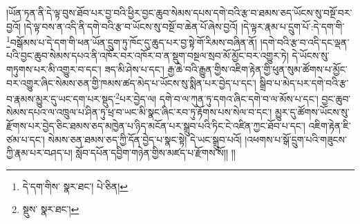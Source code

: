 །ཡོན་ཏན་ནི་དེ་ལྟ་བུས་ཐོབ་པར་བྱ་བའི་ཕྱིར་བྱང་ཆུབ་སེམས་དཔས་དགེ་བའི་རྩ་བ་ཐམས་ཅད་ཡོངས་སུ་བསྔོ་བར་བྱའོ། །དེ་ལྟ་བས་ན་འདི་ནི་དགེ་བའི་རྩ་བ་ཡོངས་སུ་བསྔོ་བ་ཆེན་པོ་ཞེས་བྱའོ། །དེ་ལྟར་རྣམ་པ་དྲུག་པོ་:དེ་དག་གི་\footnote{དེ་དག་གིས་  སྣར་ཐང་།  པེ་ཅིན། }བསྒོམས་པ་དེ་དག་གི་ཕན་ཡོན་དྲུག་ཏུ་ཁོང་དུ་ཆུད་པར་བྱ་སྟེ་གོ་རིམས་བཞིན་ནོ། །དགེ་བའི་རྩ་བ་འདི་དང་ལྡན་པའི་བྱང་ཆུབ་སེམས་དཔའ་ནི་འཁོར་བར་འཁོར་བ་ན་སྡུག་བསྔལ་སྲབ་མོ་མྱོང་བར་འགྱུར་ཏེ། དེ་ཡོངས་སུ་གཏུགས་པར་མི་འགྱུར་བ་དང་། ཟད་མི་ཤེས་པ་དང་། རྒྱ་ཆེ་བའི་རྒྱུན་གྱིས་འཇིག་རྟེན་གྱི་ཕུན་སུམ་ཚོགས་པ་མྱོང་བར་འགྱུར་ཞིང་སེམས་ཅན་གྱི་ཁམས་ཚད་མེད་པ་ཡོངས་སུ་སྨིན་པར་བྱེད་པ་དང་། སྒྲིབ་པ་མེད་པར་དགེ་བའི་རྩ་བ་རྣམས་མྱུར་དུ་ཡང་དག་པར་སྡུད་\footnote{སྡུས་  སྣར་ཐང་། }པར་བྱེད་ལ། དགེ་བ་ལ་ཀུན་ཏུ་དགའ་ཞིང་དགེ་བ་ལ་མོས་པ་དང་། བྱང་ཆུབ་སེམས་དཔའ་ལ་འཁྲུལ་པ་ཤིན་ཏུ་ཕྲ་བ་ཡང་མི་སྣང་ཞིང་རབ་ཏུ་རྟོགས་པས་སེལ་བ་དང་། མྱུར་དུ་ཚོགས་ཡོངས་སུ་རྫོགས་པར་བྱེད་ཅིང་ཐམས་ཅད་མཁྱེན་པ་ཉིད་མངོན་པར་སྒྲུབ་པའི་ཏིང་ངེ་འཛིན་ཀྱང་ཐོབ་པ་དང་། འཇིག་རྟེན་ཇི་ཙམ་པ་དང་། སེམས་ཅན་ཐམས་ཅད་ཀྱི་དོན་བྱེད་པ་སྣང་སྟེ། དེ་ཡང་སྒྲུབ་པའོ། །འཕགས་པ་སྒོ་དྲུག་པའི་གཟུངས་ཀྱི་རྣམ་པར་བཤད་པ། སློབ་དཔོན་དབྱིག་གཉེན་གྱིས་མཛད་པ་རྫོགས་སོ།། །།